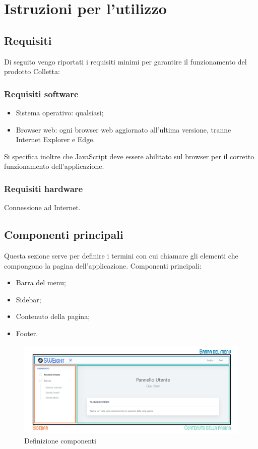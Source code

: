 \section{Istruzioni per l'utilizzo}
\subsection{Requisiti}
Di seguito vengo riportati i requisiti minimi per garantire il funzionamento del prodotto Colletta:
\subsubsection{Requisiti software}
\begin{itemize}
\item {Sistema operativo:} qualsiasi;
\item {Browser web:} ogni browser web aggiornato all'ultima versione, tranne Internet Explorer e Edge.
\end{itemize}
Si specifica inoltre che JavaScript deve essere abilitato sul browser per il corretto funzionamento dell’applicazione.
\subsubsection{Requisiti hardware}
Connessione ad Internet.
\subsection{Componenti principali}
Questa sezione serve per definire i termini con cui chiamare gli elementi che compongono la pagina dell'applicazione.
Componenti principali:
\begin{itemize}
    \item Barra del menu;
    \item {Sidebar};
    \item Contenuto della pagina;
    \item Footer.
\end{itemize}

\begin{figure}[H]
    \centering
    \includegraphics[width=17cm]{sez/img/istruzioni/dashboardMod.png} 
    \caption{Definizione componenti}\label{fig:1}
\end{figure}

